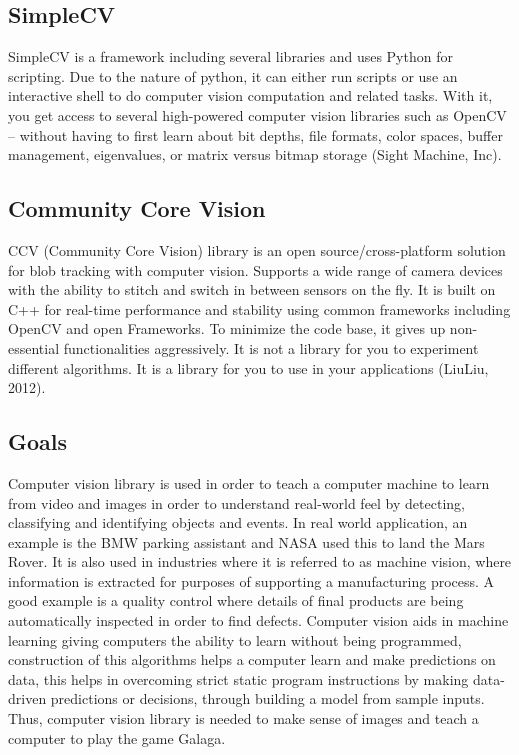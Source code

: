 \subsection{SimpleCV}
SimpleCV is a framework including several libraries and uses Python for scripting.
Due to the nature of python, it can either run scripts or use an interactive shell to do computer vision computation and related tasks.
With it, you get access to several high-powered computer vision libraries such as OpenCV – without having to first learn about bit depths,
file formats, color spaces, buffer management, eigenvalues, or matrix versus bitmap storage (Sight Machine, Inc).
\subsection{Community Core Vision}
CCV (Community Core Vision) library is an open source/cross-platform solution for blob tracking with computer vision.
Supports a wide range of camera devices with the ability to stitch and switch in between sensors on the fly.
It is built on C++ for real-time performance and stability using common frameworks including OpenCV and open Frameworks.
To minimize the code base, it gives up non-essential functionalities aggressively.
It is not a library for you to experiment different algorithms.
It is a library for you to use in your applications (LiuLiu, 2012).

\subsection{Goals}
Computer vision library is used in order to teach a computer machine to learn from video and images in order to understand real-world feel by detecting,
classifying and identifying objects and events.
In real world application, an example is the BMW parking assistant and NASA used this to land the Mars Rover.
It is also used in industries where it is referred to as machine vision, where information is extracted for purposes of supporting a manufacturing process.
A good example is a quality control where details of final products are being automatically inspected in order to find defects.
Computer vision aids in machine learning giving computers the ability to learn without being programmed,
construction of this algorithms helps a computer learn and make predictions on data,
this helps in overcoming strict static program instructions by making data-driven predictions or decisions,
through building a model from sample inputs.
Thus, computer vision library is needed to make sense of images and teach a computer to play the game Galaga.


